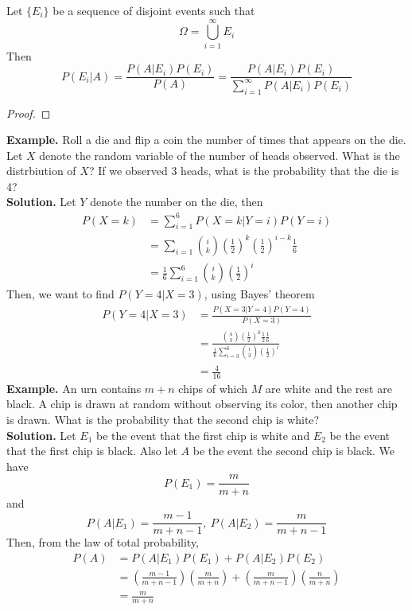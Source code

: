 \begin{theorem}
    Let $\{E_i\}$ be a sequence of disjoint events such that 
    \[\Omega = \bigcup_{i=1}^\infty E_i\]
    Then 
    \[P(E_i | A) = \frac{P(A|E_i)P(E_i)}{P(A)} = \frac{P(A | E_i)P(E_i)}{\sum_{i=1}^\infty P(A | E_i)P(E_i)}\]
\end{theorem}
\begin{proof}
    
\end{proof}
\textbf{Example.} Roll a die and flip a coin the number of times that appears on the die. Let $X$ denote the random variable of the number of heads observed. What is the distrbiution of $X$? If we observed 3 heads, what is the probability that the die is 4?\\[2ex]
\textbf{Solution.} Let $Y$ denote the number on the die, then 
\begin{align*}
    P(X = k) &= \sum_{i=1}^{6} P(X = k | Y = i)P(Y = i)\\
    &= \sum_{i=1}{i \choose k} \left(\frac{1}{2}\right)^k \left(\frac{1}{2}\right)^{i-k} \frac{1}{6}\\
    &= \frac{1}{6}\sum_{i=1}^6 {i \choose k} \left(\frac{1}{2}\right)^i
\end{align*}
Then, we want to find $P(Y = 4 | X = 3)$, using Bayes' theorem
\begin{align*}
    P(Y = 4 | X = 3) &= \frac{P(X=3|Y=4)P(Y=4)}{P(X=3)}\\
    &= \frac{{4 \choose 3}\left(\frac{1}{2}\right)^k\frac{1}{2}\frac{1}{6}}{\frac{1}{6}\sum_{i=3}^6{i \choose 3}\left(\frac{1}{2}\right)^i}\\
    &= \frac{4}{16}
\end{align*}
\textbf{Example.} An urn contains $m+n$ chips of which $M$ are white and the rest are black. A chip is drawn at random without observing its color, then another chip is drawn. What is the probability that the second chip is white?\\[2ex]
\textbf{Solution.}
Let $E_1$ be the event that the first chip is white and $E_2$ be the event that the first chip is black. Also let $A$ be the event the second chip is black. We have 
\[P(E_1) = \frac{m}{m+n}\]
and 
\[P(A|E_1) = \frac{m-1}{m+n-1}, \ P(A|E_2) = \frac{m}{m+n-1}\]
Then, from the law of total probability, 
\begin{align*}
    P(A) &= P(A|E_1)P(E_1)+ P(A|E_2)P(E_2)\\
    &= \left(\frac{m-1}{m+n-1}\right)\left(\frac{m}{m+n}\right) + \left(\frac{m}{m+n-1}\right)\left(\frac{n}{m+n}\right) \\
    &= \frac{m}{m+n}
\end{align*}